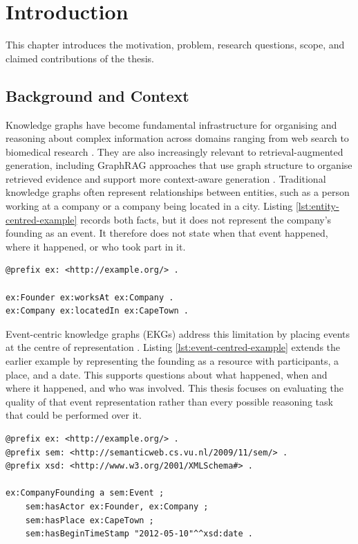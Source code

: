 \chapter{Introduction}

This chapter introduces the motivation, problem, research questions, scope, and claimed contributions of the thesis.

\section{Background and Context}

Knowledge graphs have become fundamental infrastructure for organising and reasoning about complex information across domains ranging from web search to biomedical research \citep{kgquality2024}. They are also increasingly relevant to retrieval-augmented generation, including GraphRAG approaches that use graph structure to organise retrieved evidence and support more context-aware generation \citep{edge2024graphrag,han2025graphrag}. Traditional knowledge graphs often represent relationships between entities, such as a person working at a company or a company being located in a city. Listing \ref{lst:entity-centred-example} records both facts, but it does not represent the company's founding as an event. It therefore does not state when that event happened, where it happened, or who took part in it.

\begin{lstlisting}[language={},numbers=none,caption={A small entity-centred RDF example.},label={lst:entity-centred-example}]
@prefix ex: <http://example.org/> .

ex:Founder ex:worksAt ex:Company .
ex:Company ex:locatedIn ex:CapeTown .
\end{lstlisting}

Event-centric knowledge graphs (EKGs) address this limitation by placing events at the centre of representation \citep{sem2011}. Listing \ref{lst:event-centred-example} extends the earlier example by representing the founding as a resource with participants, a place, and a date. This supports questions about what happened, when and where it happened, and who was involved. This thesis focuses on evaluating the quality of that event representation rather than every possible reasoning task that could be performed over it.

\noindent\begin{minipage}{0.96\textwidth}
\begin{lstlisting}[language={},numbers=none,caption={An event-centred extension of the earlier RDF example.},label={lst:event-centred-example}]
@prefix ex: <http://example.org/> .
@prefix sem: <http://semanticweb.cs.vu.nl/2009/11/sem/> .
@prefix xsd: <http://www.w3.org/2001/XMLSchema#> .

ex:CompanyFounding a sem:Event ;
    sem:hasActor ex:Founder, ex:Company ;
    sem:hasPlace ex:CapeTown ;
    sem:hasBeginTimeStamp "2012-05-10"^^xsd:date .
\end{lstlisting}
\end{minipage}

